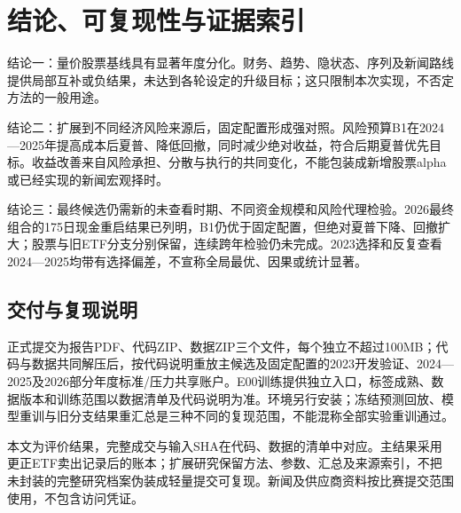 \documentclass[12pt]{article}
\begin{document}
\section{结论、可复现性与证据索引}
结论一：量价股票基线具有显著年度分化。财务、趋势、隐状态、序列及新闻路线提供局部互补或负结果，未达到各轮设定的升级目标；这只限制本次实现，不否定方法的一般用途。

结论二：扩展到不同经济风险来源后，固定配置形成强对照。风险预算B1在2024—2025年提高成本后夏普、降低回撤，同时减少绝对收益，符合后期夏普优先目标。收益改善来自风险承担、分散与执行的共同变化，不能包装成新增股票alpha或已经实现的新闻宏观择时。

结论三：最终候选仍需新的未查看时期、不同资金规模和风险代理检验。2026最终组合的175日现金重启结果已列明，B1仍优于固定配置，但绝对夏普下降、回撤扩大；股票与旧ETF分支分别保留，连续跨年检验仍未完成。2023选择和反复查看2024—2025均带有选择偏差，不宣称全局最优、因果或统计显著。

\subsection*{交付与复现说明}
正式提交为报告PDF、代码ZIP、数据ZIP三个文件，每个独立不超过100MB；代码与数据共同解压后，按代码说明重放主候选及固定配置的2023开发验证、2024—2025及2026部分年度标准/压力共享账户。E00训练提供独立入口，标签成熟、数据版本和训练范围以数据清单及代码说明为准。环境另行安装；冻结预测回放、模型重训与旧分支结果重汇总是三种不同的复现范围，不能混称全部实验重训通过。

本文为评价结果，完整成交与输入SHA在代码、数据的清单中对应。主结果采用更正ETF卖出记录后的账本；扩展研究保留方法、参数、汇总及来源索引，不把未封装的完整研究档案伪装成轻量提交可复现。新闻及供应商资料按比赛提交范围使用，不包含访问凭证。
\end{document}
